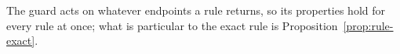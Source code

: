 
The guard acts on whatever endpoints a rule returns, so its properties hold
for every rule at once; what is particular to the exact rule is
Proposition~\ref{prop:rule-exact}.

